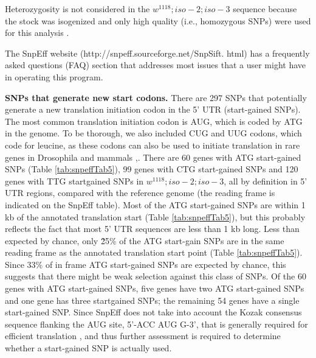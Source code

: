 Heterozygosity is not considered in the $w^{1118} ; iso-2; iso-3$ sequence because the stock was isogenized and only high quality (i.e., homozygous SNPs) were used for this analysis \cite{platts2009massively}.

The SnpEff website (http://snpeff.sourceforge.net/SnpSift.  html) has a frequently asked questions (FAQ) section that addresses most issues that a user might have in operating this program.

\textbf{SNPs that generate new start codons.} There are 297 SNPs that potentially generate a new translation initiation codon in the 5' UTR (start-gained SNPs). The most common translation initiation codon is AUG, which is coded by ATG in the genome.  To be thorough, we also included CUG and UUG codons, which code for leucine, as these codons can also be used to initiate translation in rare genes in Drosophila and mammals \cite{sugihara1990drosophila},\cite{ivanov2011identification}. There are 60 genes with ATG start-gained SNPs (Table \ref{tab:snpeffTab5}), 99 genes with CTG start-gained SNPs and 120 genes with TTG startgained SNPs in $w^{1118} ; iso-2; iso-3$, all by definition in 5' UTR regions, compared with the reference genome (the reading frame is indicated on the SnpEff table). Most of the ATG start-gained SNPs are within 1 kb of the annotated translation start (Table \ref{tab:snpeffTab5}), but this probably reflects the fact that most 5' UTR sequences are less than 1 kb long. Less than expected by chance, only \~25\% of the ATG start-gain SNPs are in the same reading frame as the annotated translation start point (Table \ref{tab:snpeffTab5}). Since 33\% of in frame ATG start-gained SNPs are expected by chance, this suggests that there might be weak selection against this class of SNPs. Of the 60 genes with ATG start-gained SNPs, five genes have two ATG start-gained SNPs and one gene has three startgained SNPs; the remaining 54 genes have a single start-gained SNP. Since SnpEff does not take into account the Kozak consensus sequence flanking the AUG site, 5'-ACC AUG G-3', that is generally required for efficient translation \cite{kozak1987analysis}, and thus further assessment is required to determine whether a start-gained SNP is actually used.


